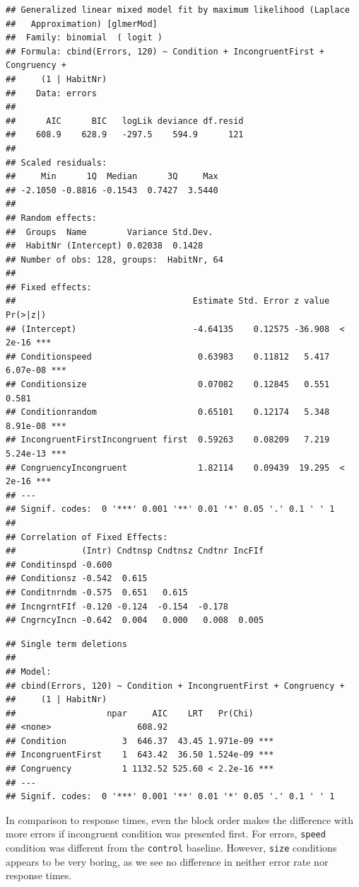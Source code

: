 \documentclass[
]{book}
\begin{document}
\begin{verbatim}
## Generalized linear mixed model fit by maximum likelihood (Laplace
##   Approximation) [glmerMod]
##  Family: binomial  ( logit )
## Formula: cbind(Errors, 120) ~ Condition + IncongruentFirst + Congruency +  
##     (1 | HabitNr)
##    Data: errors
## 
##      AIC      BIC   logLik deviance df.resid 
##    608.9    628.9   -297.5    594.9      121 
## 
## Scaled residuals: 
##     Min      1Q  Median      3Q     Max 
## -2.1050 -0.8816 -0.1543  0.7427  3.5440 
## 
## Random effects:
##  Groups  Name        Variance Std.Dev.
##  HabitNr (Intercept) 0.02038  0.1428  
## Number of obs: 128, groups:  HabitNr, 64
## 
## Fixed effects:
##                                   Estimate Std. Error z value Pr(>|z|)    
## (Intercept)                       -4.64135    0.12575 -36.908  < 2e-16 ***
## Conditionspeed                     0.63983    0.11812   5.417 6.07e-08 ***
## Conditionsize                      0.07082    0.12845   0.551    0.581    
## Conditionrandom                    0.65101    0.12174   5.348 8.91e-08 ***
## IncongruentFirstIncongruent first  0.59263    0.08209   7.219 5.24e-13 ***
## CongruencyIncongruent              1.82114    0.09439  19.295  < 2e-16 ***
## ---
## Signif. codes:  0 '***' 0.001 '**' 0.01 '*' 0.05 '.' 0.1 ' ' 1
## 
## Correlation of Fixed Effects:
##             (Intr) Cndtnsp Cndtnsz Cndtnr IncFIf
## Conditinspd -0.600                              
## Conditionsz -0.542  0.615                       
## Conditnrndm -0.575  0.651   0.615               
## IncngrntFIf -0.120 -0.124  -0.154  -0.178       
## CngrncyIncn -0.642  0.004   0.000   0.008  0.005
\end{verbatim}

\begin{verbatim}
## Single term deletions
## 
## Model:
## cbind(Errors, 120) ~ Condition + IncongruentFirst + Congruency + 
##     (1 | HabitNr)
##                  npar     AIC    LRT   Pr(Chi)    
## <none>                 608.92                     
## Condition           3  646.37  43.45 1.971e-09 ***
## IncongruentFirst    1  643.42  36.50 1.524e-09 ***
## Congruency          1 1132.52 525.60 < 2.2e-16 ***
## ---
## Signif. codes:  0 '***' 0.001 '**' 0.01 '*' 0.05 '.' 0.1 ' ' 1
\end{verbatim}

In comparison to response times, even the block order makes the difference with more errors if incongruent condition was presented first. For errors, \texttt{speed} condition was different from the \texttt{control} baseline. However, \texttt{size} conditions appears to be very boring, as we see no difference in neither error rate nor response times.
\end{document}
